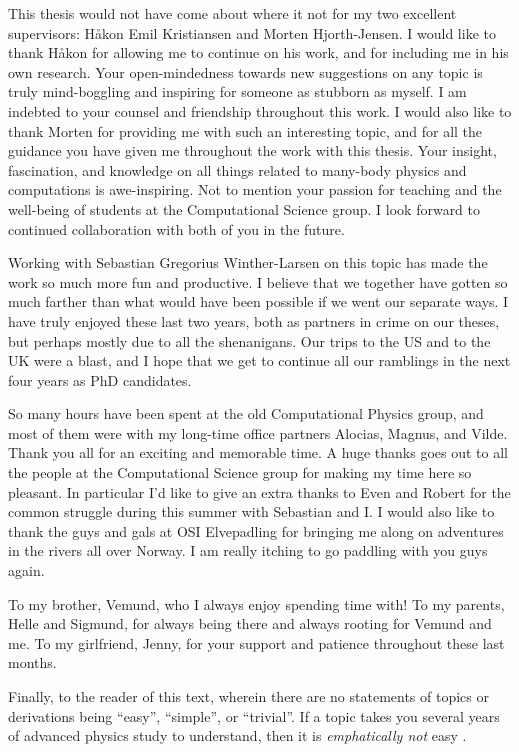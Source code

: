 This thesis would not have come about where it not for my two excellent
supervisors: Håkon Emil Kristiansen and Morten Hjorth-Jensen.
I would like to thank Håkon for allowing me to continue on his work, and for
including me in his own research.
Your open-mindedness towards new suggestions on any topic is truly mind-boggling
and inspiring for someone as stubborn as myself.
I am indebted to your counsel and friendship throughout this work.
I would also like to thank Morten for providing me with such an interesting
topic, and for all the guidance you have given me throughout the work with this
thesis.
Your insight, fascination, and knowledge on all things related to many-body
physics and computations is awe-inspiring.
Not to mention your passion for teaching and the well-being of students at the
Computational Science group.
I look forward to continued collaboration with both of you in the future.

Working with Sebastian Gregorius Winther-Larsen on this topic has made the work
so much more fun and productive.
I believe that we together have gotten so much farther than what would have been
possible if we went our separate ways.
I have truly enjoyed these last two years, both as partners in crime on our
theses, but perhaps mostly due to all the shenanigans.
Our trips to the US and to the UK were a blast, and I hope that we get to
continue all our ramblings in the next four years as PhD candidates.

So many hours have been spent at the old Computational Physics group, and most
of them were with my long-time office partners Alocias, Magnus, and Vilde.
Thank you all for an exciting and memorable time.
A huge thanks goes out to all the people at the Computational Science group for
making my time here so pleasant.
In particular I'd like to give an extra thanks to Even and Robert for the common
struggle during this summer with Sebastian and I.
I would also like to thank the guys and gals at OSI Elvepadling for bringing me
along on adventures in the rivers all over Norway.
I am really itching to go paddling with you guys again.

To my brother, Vemund, who I always enjoy spending time with!
To my parents, Helle and Sigmund, for always being there and always rooting for
Vemund and me.
To my girlfriend, Jenny, for your support and patience throughout these last
months.

Finally, to the reader of this text, wherein there are no statements of topics
or derivations being ``easy'', ``simple'', or ``trivial''.
If a topic takes you several years of advanced physics study to understand, then
it is \emph{emphatically not} easy \cite{nontrivial-manifesto}.
